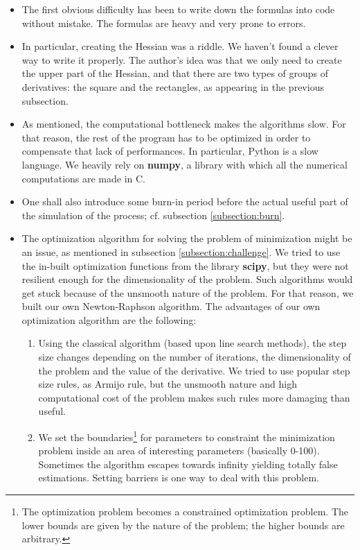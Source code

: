 \begin{itemize}
\item The first obvious difficulty has been to write down the formulas into code without mistake. The formulas are heavy and very prone to errors.
\item In particular, creating the Hessian was a riddle. We haven't found a clever way to write it properly. The author's idea was that we only need to create the upper part of the Hessian, and that there are two types of groups of derivatives: the square and the rectangles, as appearing in the previous subsection.
\item As mentioned, the computational bottleneck makes the algorithms slow. For that reason, the rest of the program has to be optimized in order to compensate that lack of performances. In particular, Python is a slow language. We heavily rely on \textbf{numpy}, a library with which all the numerical computations are made in C.
\item One shall also introduce some burn-in period before the actual useful part of the simulation of the process; cf. subsection \ref{subsection:burn}.
\item The optimization algorithm for solving the problem of minimization might be an issue, as mentioned in subsection \ref{subsection:challenge}. We tried to use the in-built optimization functions from the library \textbf{scipy}, but they were not resilient enough for the dimensionality of the problem. Such algorithms would get stuck because of the unsmooth nature of the problem. For that reason, we built our own Newton-Raphson algorithm. The advantages of our own optimization algorithm are the following:
\begin{enumerate}
\item Using the classical algorithm (based upon line search methods), the step size changes depending on the number of iterations, the dimensionality of the problem and the value of the derivative. We tried to use popular step size rules, as Armijo rule, but the unsmooth nature and high computational cost of the problem makes such rules more damaging than useful.
\item We set the boundaries\footnote{The optimization problem becomes a constrained optimization problem. The lower bounds are given by the nature of the problem; the higher bounds are arbitrary.} for parameters to constraint the minimization problem inside an area of interesting parameters (basically 0-100). Sometimes the algorithm escapes towards infinity yielding totally false estimations. Setting barriers is one way to deal with this problem. 

\end{enumerate}
\end{itemize}

